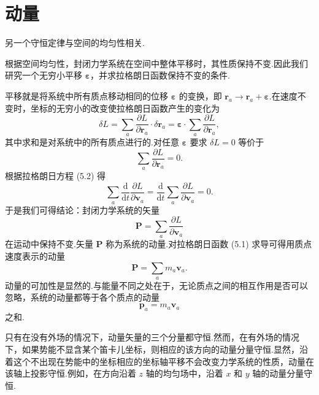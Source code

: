 \section{动量}

另一个守恒定律与空间的均匀性相关.

根据空间均匀性，封闭力学系统在空间中整体平移时，其性质保持不变.因此我们研究一个无穷小平移 $\boldsymbol{\varepsilon}$，并求拉格朗日函数保持不变的条件.

平移就是将系统中所有质点移动相同的位移 $\boldsymbol{\varepsilon}$ 的变换，即 $\boldsymbol{r}_a\to\boldsymbol{r}_a+\boldsymbol{\varepsilon}$.在速度不变时，坐标的无穷小的改变使拉格朗日函数产生的变化为
\begin{equation*}
  \delta L=\sum_a\frac{\partial L}{\partial\boldsymbol{r}_a}\cdot\delta\boldsymbol{r}_a
  =\boldsymbol{\varepsilon}\cdot\sum_a\frac{\partial L}{\partial\boldsymbol{r}_a},
\end{equation*}
其中求和是对系统中的所有质点进行的.对任意 $\boldsymbol{\varepsilon}$ 要求 $\delta L=0$ 等价于
\begin{equation}
  \sum_a\frac{\partial L}{\partial\boldsymbol{r}_a}=0.
\end{equation}
根据拉格朗日方程 (5.2) 得
\begin{equation*}
  \sum_a\frac{\mathrm{d}}{\mathrm{d}t}\frac{\partial L}{\partial\boldsymbol{v}_a}
  =\frac{\mathrm{d}}{\mathrm{d}t}\sum_a\frac{\partial L}{\partial\boldsymbol{v}_a}=0.
\end{equation*}
于是我们可得结论：封闭力学系统的矢量
\begin{equation}
  \boldsymbol{P}=\sum_a\frac{\partial L}{\partial\boldsymbol{v}_a}
\end{equation}
在运动中保持不变.矢量 $\boldsymbol{P}$ 称为系统的动量.对拉格朗日函数 (5.1) 求导可得用质点速度表示的动量
\begin{equation}
  \boldsymbol{P}=\sum_a m_a\boldsymbol{v}_a.
\end{equation}
动量的可加性是显然的.与能量不同之处在于，无论质点之间的相互作用是否可以忽略，系统的动量都等于各个质点的动量
\begin{equation*}
  \boldsymbol{p}_a=m_a\boldsymbol{v}_a
\end{equation*}
之和.

只有在没有外场的情况下，动量矢量的三个分量都守恒.然而，在有外场的情况下，如果势能不显含某个笛卡儿坐标，则相应的该方向的动量分量守恒.显然，沿着这个不出现在势能中的坐标相应的坐标轴平移不会改变力学系统的性质，动量在该轴上投影守恒.例如，在方向沿着 $z$ 轴的均匀场中，沿着 $x$ 和 $y$ 轴的动量分量守恒.

